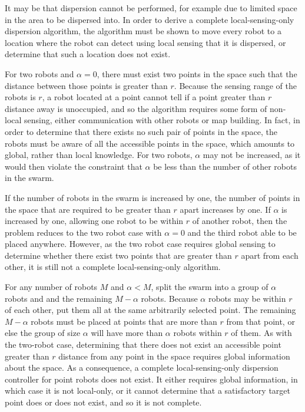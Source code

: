 It may be that dispersion cannot be performed, for example due to limited space in the area to be dispersed into. 
In order to derive a complete local-sensing-only dispersion algorithm, the algorithm must be shown to move every robot to a location where the robot can detect using local sensing that it is dispersed, or determine that such a location does not exist.

For two robots and $\alpha = 0$, there must exist two points in the space such that the distance between those points is greater than $r$. 
Because the sensing range of the robots is $r$, a robot located at a point cannot tell if a point greater than $r$ distance away is unoccupied, and so the algorithm requires some form of non-local sensing, either communication with other robots or map building. 
In fact, in order to determine that there exists no such pair of points in the space, the robots must be aware of all the accessible points in the space, which amounts to global, rather than local knowledge.%
For two robots, $\alpha$ may not be increased, as it would then violate the constraint that $\alpha$ be less than the number of other robots in the swarm. 

If the number of robots in the swarm is increased by one, the number of points in the space that are required to be greater than $r$ apart increases by one. 
If $\alpha$ is increased by one, allowing one robot to be within $r$ of another robot, then the problem reduces to the two robot case with $\alpha=0$ and the third robot able to be placed anywhere. 
However, as the two robot case requires global sensing to determine whether there exist two points that are greater than $r$ apart from each other, it is still not a complete local-sensing-only algorithm. 

For any number of robots $M$ and $\alpha < M$, split the swarm into a group of $\alpha$ robots and and the remaining $M - \alpha$ robots. 
Because $\alpha$ robots may be within $r$ of each other, put them all at the same arbitrarily selected point. 
The remaining $M - \alpha$ robots must be placed at points that are more than $r$ from that point, or else the group of size $\alpha$ will have more than $\alpha$ robots within $r$ of them.
As with the two-robot case, determining that there does not exist an accessible point greater than $r$ distance from any point in the space requires global information about the space. 
As a consequence, a complete local-sensing-only dispersion controller for point robots does not exist.
It either requires global information, in which case it is not local-only, or it cannot determine that a satisfactory target point does or does not exist, and so it is not complete.

